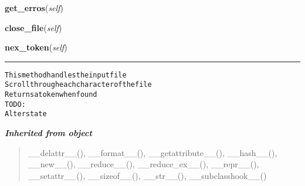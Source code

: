 \hspace{.8\funcindent}\begin{boxedminipage}{\funcwidth}

    \raggedright \textbf{get\_erros}(\textit{self})

\setlength{\parskip}{2ex}
\setlength{\parskip}{1ex}
    \end{boxedminipage}

    \label{compiladores:lexer:Lexer:close_file}

    \vspace{0.5ex}

\hspace{.8\funcindent}\begin{boxedminipage}{\funcwidth}

    \raggedright \textbf{close\_file}(\textit{self})

\setlength{\parskip}{2ex}
\setlength{\parskip}{1ex}
    \end{boxedminipage}

    \label{compiladores:lexer:Lexer:nex_token}

    \vspace{0.5ex}

\hspace{.8\funcindent}\begin{boxedminipage}{\funcwidth}

    \raggedright \textbf{nex\_token}(\textit{self})

    \vspace{-1.5ex}

    \rule{\textwidth}{0.5\fboxrule}
\setlength{\parskip}{2ex}
\begin{alltt}
This method handles the input file
Scroll through each character of the file
Returns a token when found
TODO:
        Alter state
\end{alltt}

\setlength{\parskip}{1ex}
    \end{boxedminipage}


\large{\textbf{\textit{Inherited from object}}}

\begin{quote}
\_\_delattr\_\_(), \_\_format\_\_(), \_\_getattribute\_\_(), \_\_hash\_\_(), \_\_new\_\_(), \_\_reduce\_\_(), \_\_reduce\_ex\_\_(), \_\_repr\_\_(), \_\_setattr\_\_(), \_\_sizeof\_\_(), \_\_str\_\_(), \_\_subclasshook\_\_()
\end{quote}

